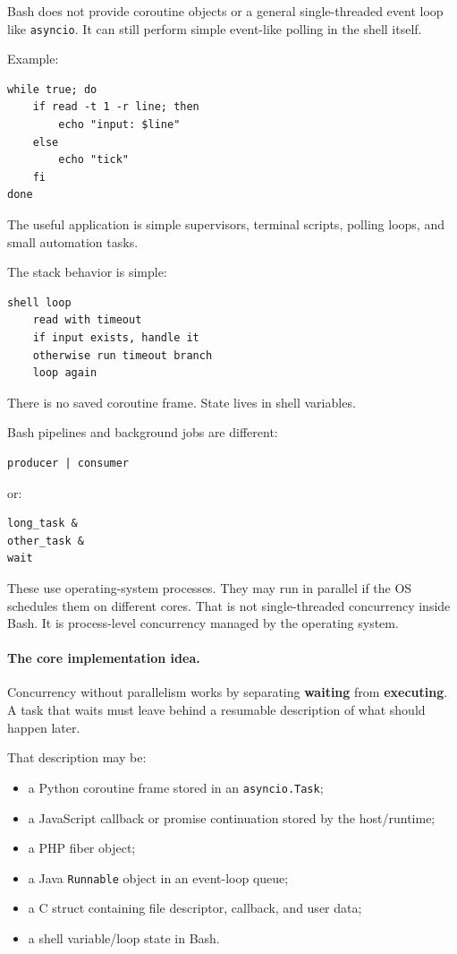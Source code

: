 Bash does not provide coroutine objects or a general single-threaded event loop like \texttt{asyncio}. It can still perform simple event-like polling in the shell itself.

Example:

\begin{verbatim}
while true; do
    if read -t 1 -r line; then
        echo "input: $line"
    else
        echo "tick"
    fi
done
\end{verbatim}

The useful application is simple supervisors, terminal scripts, polling loops, and small automation tasks.

The stack behavior is simple:

\begin{verbatim}
shell loop
    read with timeout
    if input exists, handle it
    otherwise run timeout branch
    loop again
\end{verbatim}

There is no saved coroutine frame. State lives in shell variables.

Bash pipelines and background jobs are different:

\begin{verbatim}
producer | consumer
\end{verbatim}

or:

\begin{verbatim}
long_task &
other_task &
wait
\end{verbatim}

These use operating-system processes. They may run in parallel if the OS schedules them on different cores. That is not single-threaded concurrency inside Bash. It is process-level concurrency managed by the operating system.

\paragraph{The core implementation idea.}

Concurrency without parallelism works by separating \textbf{waiting} from \textbf{executing}. A task that waits must leave behind a resumable description of what should happen later.

That description may be:

\begin{itemize}
    \item a Python coroutine frame stored in an \texttt{asyncio.Task};
    \item a JavaScript callback or promise continuation stored by the host/runtime;
    \item a PHP fiber object;
    \item a Java \texttt{Runnable} object in an event-loop queue;
    \item a C struct containing file descriptor, callback, and user data;
    \item a shell variable/loop state in Bash.
\end{itemize}

